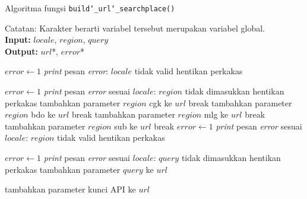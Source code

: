 \begin{algorithm}[h]
	\caption{Algoritma fungsi \texttt{build\char`_url\char`_searchplace()}}
	\label{alg:design-buildurl-searchplace}
	\vspace{-0.6\baselineskip}
	\begin{flushleft}
		Catatan: Karakter \textquotesingle *\textquotesingle\xspace berarti variabel tersebut merupakan variabel global.\\
        \textbf{Input:} $locale$, $region$, $query$ \\
        \textbf{Output:} $url$*, $error$* \\
	\end{flushleft}
	\vspace{-1.05\baselineskip}
	\begin{algorithmic}
		    \State $error \gets 1$
			\State \textit{print} pesan \textit{error}: $locale$ tidak valid
			\State hentikan perkakas
		\EndIf
		
				\State $error \gets 1$
				\State \textit{print} pesan \textit{error} sesuai $locale$: $region$ tidak dimasukkan
				\State hentikan perkakas
			\EndCase
				\State tambahkan parameter $region$ \textquotesingle\textquotesingle cgk\textquotesingle\textquotesingle\xspace ke $url$
				\State break
			\EndCase
				\State tambahkan parameter $region$ \textquotesingle\textquotesingle bdo\textquotesingle\textquotesingle\xspace ke $url$
				\State break
			\EndCase
				\State tambahkan parameter $region$ \textquotesingle\textquotesingle mlg\textquotesingle\textquotesingle\xspace ke $url$
				\State break
			\EndCase
				\State tambahkan parameter $region$ \textquotesingle\textquotesingle sub\textquotesingle\textquotesingle\xspace ke $url$
				\State break
			\EndCase
			\Default
				\State $error \gets 1$
				\State \textit{print} pesan \textit{error} sesuai $locale$: $region$ tidak valid
				\State hentikan perkakas
			\EndDefault
		\EndSwitch
		
		    \State $error \gets 1$
			\State \textit{print} pesan \textit{error} sesuai $locale$: $query$ tidak dimasukkan
			\State hentikan perkakas
		\Else
			\State tambahkan parameter $query$ ke $url$
		\EndIf
		
		\State tambahkan parameter kunci API ke $url$
	\end{algorithmic}
\end{algorithm}

